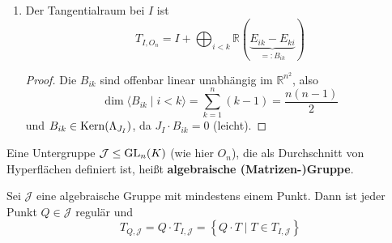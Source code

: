 \documentclass[parskip,a4paper,twoside,DIV15,BCOR12mm]{scrbook}
\begin{document}
\begin{example}
\begin{enumerate}
\begin{proof}[der Transversalität]
Bilde das Skalarprodukt zweier Zeilen von \(J_{I}\) (Zeile \(ik\) mit Zeile
\(jl\)):
\begin{align*}
\sum_{pq}{\alpha_{ik,pq}\cdot\alpha_{jl,pq}}&=
    \sum_{pq}{\left(\delta_{iq}\delta_{kp}+\delta_{kq}\delta_{ip}\right)
	\left(\delta_{jq}\delta_{lp}+\delta_{lq}\delta_{jp}\right)}\\
&=\delta_{ji}\delta_{lk}+\delta_{li}\delta_{jk}+\delta_{jk}\delta_{li}
    +\delta_{lk}\delta_{ji}\\
&=2\left(\delta_{ij}\delta_{lk}+\delta_{jl}\delta_{jk}\right)\\
&=\begin{cases}
	0&\quad\text{für }ik\neq jl\\
	2\vee 4&\quad\text{für }ik=jl
    \end{cases}
\end{align*}
\(\delta_{il}\delta_{jk}=1\) impliziert \(i=l,\,j=k\) und wegen 
\(i\leq k,\,j\leq l\) gilt \(i\leq k=j\leq l=i\), also \(ik=ii=il\).

Damit folgt: Die Zeilen von \(J_{I}\) sind paarweise orthogonal und jeweils 
ungleich Null. \(\rank(J_{I})\) ist gleich der Anzahl Zeilen. Das heißt die
\(\mathcal{F}_{ij}\) schneiden sich transversal bei \(I\).
\end{proof}
\item Der Tangentialraum bei \(I\) ist
\[
T_{I,O_{n}}=I+\bigoplus_{i<k}\mathbb{R}(\underbrace{E_{ik}-E_{ki}}_{=:B_{ik}})
\]
\begin{proof}
Die \(B_{ik}\) sind offenbar linear unabhängig im \(\mathbb{R}^{n^{2}}\), also
\[
\dim\langle B_{ik}\mid i<k\rangle=\sum_{k=1}^{n}{(k-1)}=\frac{n(n-1)}{2}
\]
und \(B_{ik}\in\operatorname{Kern}(\Lambda_{J_{I}})\), da \(J_{I}\cdot B_{ik}=0\) (leicht).
\end{proof}
\end{enumerate}
\end{example}
\begin{definition}
Eine Untergruppe \(\mathcal{J}\leq\operatorname{GL}_{n}(K)\) (wie hier \(O_{n}\)), die als
Durchschnitt von Hyperflächen definiert ist, heißt 
\textbf{algebraische (Matrizen-)Gruppe}.
\end{definition}
\begin{comment}
Solche \(\mathcal{J}\) haben den großen Vorzug, dass Regularität an 
einem Punkt \(Q\in\mathcal{J}\) sich auf alle anderen Punkte von \(\mathcal{J}\)
überträgt.
\end{comment}
\begin{theo}
\label{Satz 23.4}
Sei \(\mathcal{J}\) eine algebraische Gruppe mit mindestens einem Punkt. Dann 
ist jeder Punkt \(Q\in\mathcal{J}\) regulär und
\[
T_{Q,\mathcal{J}}=Q\cdot T_{I,\mathcal{J}}
    =\left\{Q\cdot T\mid T\in T_{I,\mathcal{J}}\right\}
\]
\end{theo}
\end{document}
